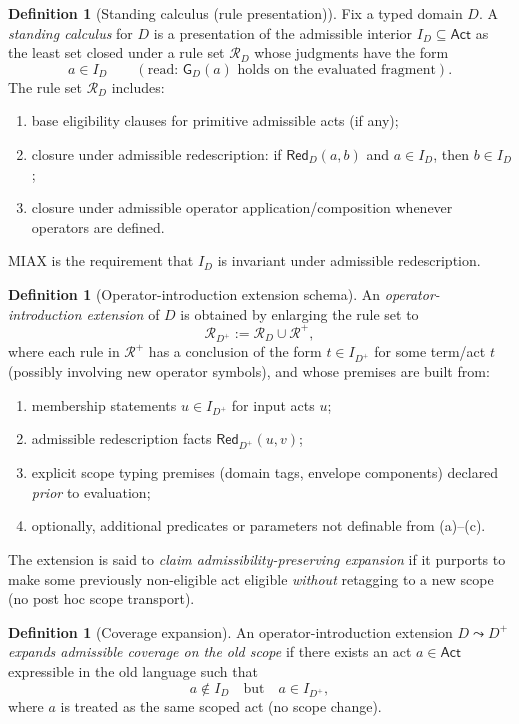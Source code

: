 \documentclass[11pt]{article}
\theoremstyle{definition}
\newtheorem{definition}[theorem]{Definition}
\newcommand{\Act}{\mathsf{Act}}
\newcommand{\Red}{\mathsf{Red}}
\newcommand{\Gate}{\mathsf{G}}
\begin{document}
\begin{definition}[Standing calculus (rule presentation)]
\label{def:standing-calculus}
Fix a typed domain $D$.
A \emph{standing calculus} for $D$ is a presentation of the admissible interior $I_D\subseteq\Act$ as the least set closed under a rule set $\mathcal{R}_D$ whose judgments have the form
\[ a\in I_D \qquad (\text{read: } \Gate_D(a)\text{ holds on the evaluated fragment}). \]
The rule set $\mathcal{R}_D$ includes:
\begin{enumerate}[label=(\roman*), leftmargin=2.0em]
\item base eligibility clauses for primitive admissible acts (if any);
\item closure under admissible redescription: if $\Red_D(a,b)$ and $a\in I_D$, then $b\in I_D$;
\item closure under admissible operator application/composition whenever operators are defined.
\end{enumerate}
MIAX is the requirement that $I_D$ is invariant under admissible redescription.
\end{definition}

\begin{definition}[Operator-introduction extension schema]
\label{def:op-intro-schema}
An \emph{operator-introduction extension} of $D$ is obtained by enlarging the rule set to
\[ \mathcal{R}_{D^+} := \mathcal{R}_D \cup \mathcal{R}^+, \]
where each rule in $\mathcal{R}^+$ has a conclusion of the form $t\in I_{D^+}$ for some term/act $t$ (possibly involving new operator symbols), and whose premises are built from:
\begin{enumerate}[label=(\alph*), leftmargin=2.0em]
\item membership statements $u\in I_{D^+}$ for input acts $u$;
\item admissible redescription facts $\Red_{D^+}(u,v)$;
\item explicit scope typing premises (domain tags, envelope components) declared \emph{prior} to evaluation;
\item optionally, additional predicates or parameters not definable from (a)--(c).
\end{enumerate}
The extension is said to \emph{claim admissibility-preserving expansion} if it purports to make some previously non-eligible act eligible \emph{without} retagging to a new scope (no post hoc scope transport).
\end{definition}

\begin{definition}[Coverage expansion]
\label{def:coverage-expansion}
An operator-introduction extension $D\leadsto D^+$ \emph{expands admissible coverage on the old scope} if there exists an act $a\in\Act$ expressible in the old language such that
\[ a\notin I_D \quad\text{but}\quad a\in I_{D^+}, \]
where $a$ is treated as the same scoped act (no scope change).
\end{definition}
\end{document}
